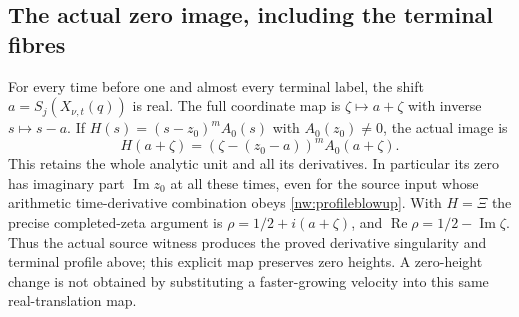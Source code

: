 \subsection*{The actual zero image, including the terminal fibres}

For every time before one and almost every terminal label, the shift
$a=S_j(X_{\nu,t}(q))$ is real. The full coordinate map is
$\zeta\mapsto a+\zeta$ with inverse $s\mapsto s-a$. If
$H(s)=(s-z_0)^mA_0(s)$ with $A_0(z_0)\ne0$, the actual image is
\[
 H(a+\zeta)=(\zeta-(z_0-a))^mA_0(a+\zeta).
\]
This retains the whole analytic unit and all its derivatives. In
particular its zero has imaginary part $\operatorname{Im}z_0$ at all
these times, even for the source input whose arithmetic time-derivative
combination obeys \eqref{nw:profileblowup}. With $H=\Xi$ the precise
completed-zeta argument is $\rho=1/2+i(a+\zeta)$, and
$\operatorname{Re}\rho=1/2-\operatorname{Im}\zeta$. Thus the actual
source witness produces the proved derivative singularity and terminal
profile above; this explicit map preserves zero heights. A zero-height
change is not obtained by substituting a faster-growing velocity into
this same real-translation map.
